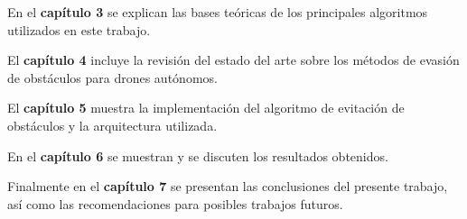     
    \par En el \textbf{capítulo 3} se explican las bases teóricas de los principales algoritmos utilizados en este trabajo. 
    
    \par El \textbf{capítulo 4} incluye la revisión del estado del arte sobre los métodos de evasión de obstáculos para drones autónomos. 
 
    \par El \textbf{capítulo 5} muestra la implementación del algoritmo de evitación de obstáculos y la arquitectura utilizada.
    
    \par En el \textbf{capítulo 6} se muestran y se discuten los resultados obtenidos.
    
    \par Finalmente en el \textbf{capítulo 7} se presentan las conclusiones del presente trabajo, así como las recomendaciones para posibles trabajos futuros. 
